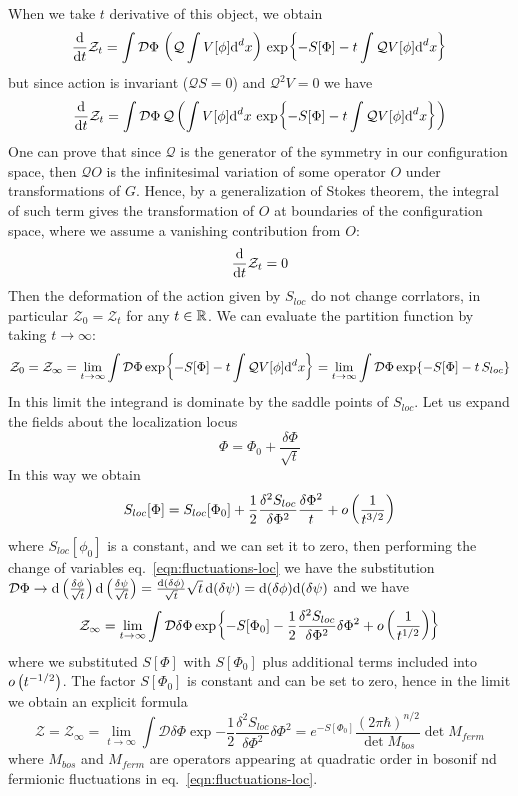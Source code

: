 \documentclass[../main/main.tex]{subfiles}
\begin{document}
When we take $t$ derivative of this object, we obtain
\[\frac{\textup{d}}{\textup{d} t}\mathcal Z_t=\int\mathcal D\Phi\,\left(\mathcal Q\int V[\phi]\textup{d}^dx\right)\,\exp{-S[\Phi]-t\int \mathcal QV[\phi]\textup{d}^dx}\]
but since action is invariant ($\mathcal QS=0$) and $\mathcal Q^2V=0$ we have 
\begin{equation}\label{eqn:loc-modif-part-deriv}
\frac{\textup{d}}{\textup{d} t}\mathcal Z_t=\int\mathcal D\Phi\,\mathcal Q\left(\int V[\phi]\textup{d}^dx\,\exp{-S[\Phi]-t\int \mathcal QV[\phi]\textup{d}^dx}\right)
\end{equation}
One can prove that since $\mathcal Q$ is the generator of the symmetry in our configuration space, then $\mathcal Q O$ is the infinitesimal variation of some operator $O$ under transformations of $G$. Hence, by a generalization of Stokes theorem, the integral of such term gives the transformation of $O$ at boundaries of the configuration space, where we assume a vanishing contribution from $O$:
\[\frac{\textup{d}}{\textup{d} t}\mathcal Z_t=0\]
Then the deformation of the action given by $S_{loc}$ do not change corrlators, in particular $\mathcal Z_0=\mathcal Z_t$ for any $t\in\mathbb{R}$. 
We can evaluate the partition function by taking  $t\to\infty$:
\[\mathcal Z_0=\mathcal Z_\infty=\lim_{t\to\infty}\int\mathcal D\Phi \exp{-S[\Phi]-t\int \mathcal QV[\phi]\textup{d}^dx}=\lim_{t\to\infty}\int\mathcal D\Phi \exp{-S[\Phi]-t\,S_{loc}}\]
In this limit the integrand is dominate by the saddle points of $S_{loc}$. Let us expand the fields about the localization locus
\begin{equation}\label{eqn:fluctuations-loc}
\Phi=\Phi_0+\frac{\delta\Phi}{\sqrt t}
\end{equation}
In this way we obtain
\begin{equation}\label{eqn:action-fluct-local}
S_{loc}[\Phi]=S_{loc}[\Phi_0]+\frac12\frac{\delta^2S_{loc}}{\delta\Phi^2}\frac{\delta\Phi^2}t+o\left(\frac1{t^{3/2}}\right)
\end{equation}
where $S_{loc}[\phi_0]$ is a constant, and we can set it to zero, then performing the change of variables eq.~\eqref{eqn:fluctuations-loc} we have the substitution $\mathcal D\Phi\to\textup{d}\left(\frac{\delta\phi}{\sqrt t}\right)\textup{d}\left(\frac{\delta\psi}{\sqrt t}\right)=\frac{\textup{d}(\delta\phi)}{\sqrt t}\sqrt t\,\textup{d}(\delta\psi)=\textup{d}(\delta\phi)\textup{d}(\delta\psi)$ and we have
\[\mathcal Z_\infty=\lim_{t\to\infty}\int\mathcal D\delta\Phi \exp{-S[\Phi_0]-\frac12\frac{\delta^2S_{loc}}{\delta\Phi^2}\delta\Phi^2+o\left(\frac1{t^{1/2}}\right)}\]
where we substituted $S[\Phi]$ with $S[\Phi_0]$ plus additional terms included into $o\left(t^{-1/2}\right)$. The factor $S[\Phi_0]$ is constant and can be set to zero, hence in the limit we obtain an explicit formula
\[\mathcal Z=\mathcal Z_\infty=\lim_{t\to\infty}\int\mathcal D\delta\Phi \exp{-\frac12\frac{\delta^2S_{loc}}{\delta\Phi^2}\delta\Phi^2}=e^{-S[\Phi_0]}\frac{(2\pi\hbar)^{n/2}}{\det M_{bos}}\det M_{ferm}\]
where $M_{bos}$ and $M_{ferm}$ are operators appearing at quadratic order in bosonif nd fermionic fluctuations in eq.~\eqref{eqn:fluctuations-loc}.
\end{document}
